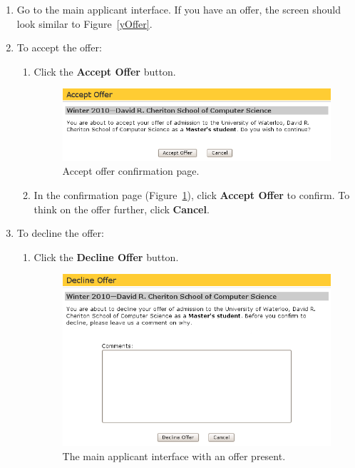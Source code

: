 \documentclass[titlepage]{article}
\begin{document}
\begin{enumerate}
\item Go to the main applicant interface. If you have an offer, the screen
  should look similar to Figure~\ref{yOffer}.
\item To accept the offer:
  \begin{enumerate}
    \item Click the \textbf{\textsf{Accept Offer}} button.

\begin{figure}[h!]
  \begin{center}
  \includegraphics[width=13cm]{acceptoffer.png}
  \end{center}
  \caption{Accept offer confirmation page.}
  \label{yAcceptOffer}
\end{figure}

    \item In the confirmation page (Figure~\ref{yAcceptOffer}), click
      \textbf{\textsf{Accept Offer}} to confirm. To think on the offer
      further, click \textbf{\textsf{Cancel}}.
  \end{enumerate}
\item To decline the offer:
  \begin{enumerate}
    \item Click the \textbf{\textsf{Decline Offer}} button.

\begin{figure}[h!]
  \begin{center}
  \includegraphics[width=13cm]{declineoffer.png}
  \end{center}
  \caption{The main applicant interface with an offer present.}
  \label{yDeclineOffer}
\end{figure}


\end{enumerate}
\end{enumerate}
\end{document}
